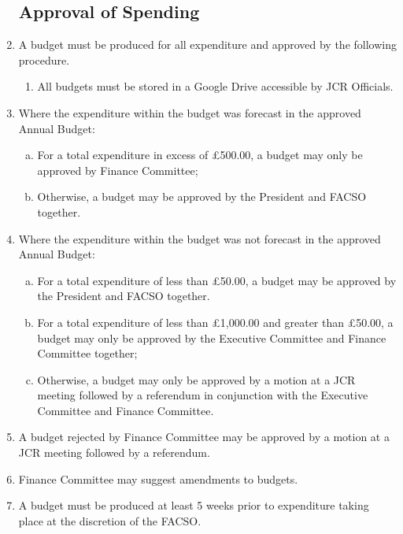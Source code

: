 \documentclass[12pt]{article}
\begin{document}
\begin{enumerate}
    \subsection{Approval of Spending}
    \item A budget must be produced for all expenditure and approved by the following procedure.
    \begin{enumerate}
        \item All budgets must be stored in a Google Drive accessible by JCR Officials.
    \end{enumerate}
    \item Where the expenditure within the budget was forecast in the approved Annual Budget:
    \begin{enumerate}[(a)]
        \item For a total expenditure in excess of £500.00, a budget may only be approved by Finance Committee;
        \item Otherwise, a budget may be approved by the President and FACSO together.
    \end{enumerate}
    \item Where the expenditure within the budget was not forecast in the approved Annual Budget:
    \begin{enumerate}[(a)]                 \item For a total expenditure of     less than £50.00, a budget may      be approved by the President        and    FACSO together.
        \item For a total expenditure of  less than £1,000.00 and greater than £50.00, a budget may only be approved by the Executive Committee and Finance Committee together;
        \item Otherwise, a budget may only be approved by a motion at a JCR meeting followed by a referendum in conjunction with the Executive Committee and Finance Committee. 
    \end{enumerate}
    \item A budget rejected by Finance Committee may be approved by a motion at a JCR meeting followed by a referendum.
    \item Finance Committee may suggest amendments to budgets.
    \item A budget must be produced at least 5 weeks prior to expenditure taking place at the discretion of the FACSO. 


\end{enumerate}
\end{document}
